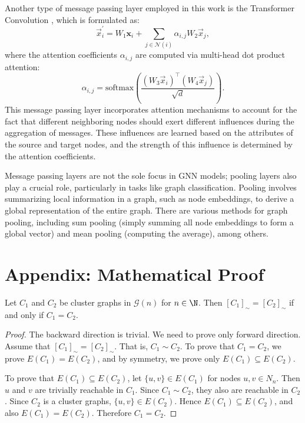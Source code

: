 Another type of message passing layer employed in this work is the Transformer Convolution \cite{transformerconv}, which is formulated as:
\begin{equation}
	\vec{x}^{\prime}_i = {W}_1 \mathbf{x}_i +\sum_{j \in \mathcal{N}(i)} \alpha_{i,j} {W}_2 \vec{x}_{j},
\end{equation}
where the attention coefficients $\alpha_{i,j}$ are computed via multi-head dot product attention:
\begin{equation}
\alpha_{i,j} = \textrm{softmax} \left(\frac{({W}_3\vec{x}_i)^{\top} ({W}_4\vec{x}_j)}{\sqrt{d}} \right).\label{attention}
\end{equation}
This message passing layer incorporates attention mechanisms to account for the fact that different neighboring nodes should exert different influences during the aggregation of messages. These influences are learned based on the attributes of the source and target nodes, and the strength of this influence is determined by the attention coefficients.

Message passing layers are not the sole focus in GNN models; pooling layers also play a crucial role, particularly in tasks like graph classification. Pooling involves summarizing local information in a graph, such as node embeddings, to derive a global representation of the entire graph. There are various methods for graph pooling, including sum pooling (simply summing all node embeddings to form a global vector) and mean pooling (computing the average), among others.


\section{Appendix: Mathematical Proof}\label{proof}


\begin{prop}\label{represent_equi}
	Let $C_1$ and $C_2$ be cluster graphs in $\mathcal{G}(n)$ for $n \in \N$. Then
	$[C_1]_\sim = [C_2]_\sim$ if and only if $C_1 = C_2$.
\end{prop}
\begin{proof}
	The backward direction is trivial. We need to prove only forward direction.
	Assume that $[C_1]_\sim = [C_2]_\sim$. That is, $C_1 \sim C_2$.
	To prove that $C_1 = C_2$, we prove $E(C_1) = E(C_2)$, and by symmetry, we prove only $E(C_1) \subseteq E(C_2)$.
	
	To prove that $E(C_1) \subseteq E(C_2)$, let $\{u,v\} \in E(C_1)$ for nodes $u,v \in N_n$. Then $u$ and $v$ are trivially reachable in $C_1$.
	Since $C_1\sim C_2$, they also are reachable in $C_2$.
	Since $C_2$ is a cluster graphs, $\{u, v\} \in E(C_2)$.
	Hence $E(C_1) \subseteq E(C_2)$, and also $E(C_1) = E(C_2)$. Therefore $C_1 = C_2$.
\end{proof}


